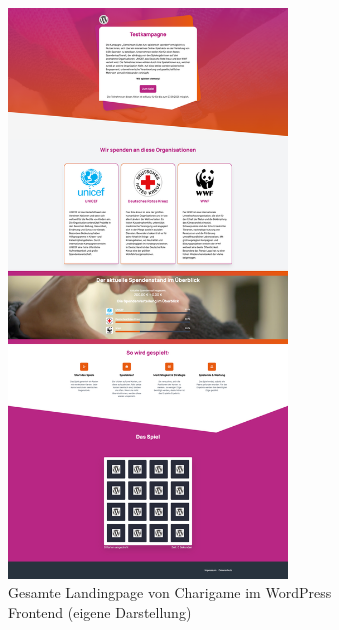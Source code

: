 \documentclass[
	ngerman,
	BCOR=8mm,
	headings=normal,
	parskip=half,
	headsepline,
	automark,
	listof=totoc,
	bibliography=totoc,
]{scrreprt}
\begin{document}
\begin{figure}[H]
    \centering
    \includegraphics[width=0.66\textwidth]{images/legacy_landingpage_frontend}
    \caption{Gesamte Landingpage von Charigame im WordPress \\Frontend  (eigene Darstellung)}
    \label{fig:landing-frontend-legacy}
\end{figure}
\end{document}
